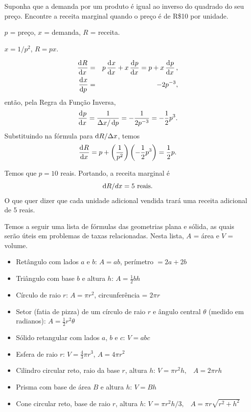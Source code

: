 \begin{example}
  Suponha que a demanda por um produto é igual ao inverso do quadrado do
  seu preço. Encontre a receita marginal quando o preço é de R\$10 por
  unidade.
\begin{stepanalysis}
\item $p$ = preço, $x$ = demanda, $R$ = receita.
\item $x = 1/p^2$, $R = px.$
\item
  \begin{eqnarray*}
    \dod R x & = & p \dod x x + x \dod p x = p + x \dod p x, \\
    \dod x p & = & -2p^{-3},
  \end{eqnarray*}
  então, pela Regra da Função Inversa,
  $$
    \dod p x = \frac{1}{\dx/\dif p} = -\frac{1}{2p^{-3}} = -\frac{1}{2}p^3.
  $$
  Substituindo na fórmula para $\dif R/\dx$, temos
  $$
    \dod R x = p + \left(\frac{1}{p^2}\right)\left(-\frac{1}{2}p^3\right)
      = \frac{1}{2} p.
  $$
\item Temos que $p = 10$ reais. Portando, a receita marginal é
  $$
    \dif R/dx = 5 \text{ reais.}
  $$
  O que quer dizer que cada unidade adicional vendida trará uma receita
  adicional de 5 reais.
\end{stepanalysis}
\end{example}

Temos a seguir uma lista de fórmulas das
geometrias plana e sólida, as quais serão úteis em problemas de taxas
relacionadas. Nesta lista, $A$ = área e $V$ = volume.
\begin{itemize}
  \item Retângulo com lados $a$ e $b$: \;\;\;
        $A = ab$, \;\;\; perímetro $= 2a + 2b$
  \item Triângulo com base $b$ e altura $h$: \;\;\;
        $A = \frac{1}{2}bh$
  \item Círculo de raio $r$: \;\;\;
        $A = \pi r^2$, \;\;\; circunferência = $2\pi r$
  \item Setor (fatia de pizza) de um círculo de raio $r$ e ângulo
        central $\theta$ (medido em radianos): \;\;\;
        $A = \frac{1}{2}r^2 \theta$
  \item Sólido retangular com lados $a$, $b$ e $c$: \;\;\;
        $V = abc$
  \item Esfera de raio $r$: \;\;\;
        $V = \frac{4}{3}\pi r^3$, \;\;\; $A = 4\pi r^2$
  \item Cilindro circular reto, raio da base $r$, altura $h$: \;\;\;
        $V = \pi r^2 h, \;\;\; A = 2\pi r h$
  \item Prisma com base de área $B$ e altura $h$: \;\;\;
        $V = Bh$
  \item Cone circular reto, base de raio $r$, altura $h$: \;\;\;
        $V = \pi r^2 h/3, \;\;\; A = \pi r \sqrt{r^2 + h^2}$
\end{itemize}

